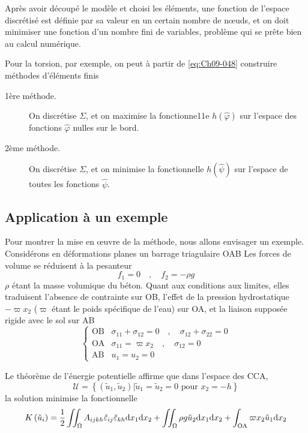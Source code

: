 Après avoir découpé le modèle et choisi les éléments, une fonction de l'espace discrétisé est définie par sa valeur en un certain nombre de nœuds, et on doit minimiser une fonction d'un nombre fini de variables, problème qui se prête bien au calcul numérique. 

Pour la torsion, par exemple, on peut à partir de \eqref{eq:Ch09-048} construire méthodes d'éléments finis
\begin{description}
    \item[1ère méthode.] On discrétise $\Sigma$, et on maximise la fonctionne11e $h(\hat{\varphi})$ sur l'espace des fonctions $\hat{\varphi}$ nulles sur le bord. 
    \item[2ème méthode.] On discrétise $\Sigma$, et on minimise la fonctionnelle $h(\hat{\psi})$ sur l'espace de toutes les fonctions $\hat{\psi}$.
\end{description}

\subsection{Application à un exemple} \label{ssec:Ch09-3.2}
Pour montrer la mise en œuvre de la méthode, nous allons envisager un exemple.
Considérons en déformations planes un barrage triagulaire OAB
Les forces de volume se réduisent à la pesanteur 
\begin{equation}
    f_1 = 0 \quad,\quad f_2 = -\rho g
    \label{eq:Ch09-067}
\end{equation}
$\rho$ étant la masse volumique du béton.
Quant aux conditions aux limites, elles traduisent l'absence de contrainte sur OB, l'effet de la pression hydrostatique $-\varpi x_2$ ($\varpi$ étant le poids spécifique de l'eau) sur OA, et la liaison supposée rigide avec le sol sur AB 
\begin{equation}
    \left\{
    \begin{aligned}
        \text{OB} & \sigma_{11} + \sigma_{12} = 0 \quad,\quad \sigma_{12} + \sigma_{22} = 0 \\
        \text{OA} & \sigma_{11} = \varpi x_2 \quad,\quad \sigma_{12} = 0 \\
        \text{AB} & u_1 = u_2 = 0
    \end{aligned}
    \right.
    \label{eq:Ch09-068}
\end{equation}

Le théorème de l'énergie potentielle affirme que dans l'espace des CCA, 
\begin{equation}
    \mathcal{U} = \left\{ \left( \tilde{u}_1, \tilde{u}_2 \right) | \tilde{u}_1 = \tilde{u}_2 = 0 \text{ pour } x_2 = -h \right\}
    \label{eq:Ch09-069}
\end{equation}
la solution minimise la fonctionnelle 
\begin{equation}
    K\left( \tilde{u}_i \right) = \frac{1}{2} \iint_{\Omega} A_{ijkh} \tilde{\varepsilon}_{ij} \tilde{\varepsilon}_{kh} \mathrm{d} x_1 \mathrm{d} x_2 + \iint_{\Omega} \rho g \tilde{u}_2 \mathrm{d} x_1 \mathrm{d} x_2 + \int_{\text{OA}} \varpi x_2 \tilde{u}_1 \mathrm{d} x_2
    \label{eq:Ch09-070}
\end{equation}

